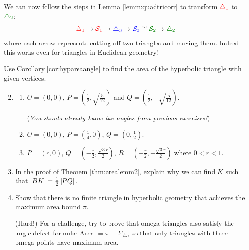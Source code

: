 We can now follow the steps in Lemma \ref{lemm:quadtricorr} to transform $\textcolor{red}{\triangle_1}$ to $\textcolor{Green}{\triangle_2}$:
\[
	\textcolor{red}{\triangle_1}\to \textcolor{red}{\cS_1}\to \textcolor{blue}{\triangle_3}\to \textcolor{blue}{\cS_3}\cong \textcolor{Green}{\cS_2}\to \textcolor{Green}{\triangle_2}
\]
where each arrow represents cutting off two triangles and moving them. Indeed this works even for triangles in Euclidean geometry!

\goodbreak


\begin{exercises}
	\exstart Use Corollary \ref{cor:hypareaangle} to find the area of the hyperbolic triangle with given vertices.
	\begin{enumerate}\setcounter{enumi}{1}
	  \item[]\begin{enumerate}
	    \item $O=(0,0)$, $P=(\frac 12,\sqrt{\frac 5{12}})$ and $Q=(\frac 12,-\sqrt{\frac 5{12}})$.\par
			(\emph{You should already know the angles from previous exercises!})
	    \item $O=(0,0)$, $P=(\frac 14,0)$, $Q=(0,\frac 12)$.
	    \item $P=(r,0)$, $Q=\left(-\frac r2,\frac{\sqrt{3}r}2\right)$, $R=\left(-\frac r2,-\frac{\sqrt{3}r}2\right)$ where $0<r<1$.
		\end{enumerate}
		
		\item In the proof of Theorem \ref{thm:arealemm2}, explain why we can find $K$ such that $\left| BK\right|=\frac 12\left| PQ\right|$. 
		
		

   
	   \item Show that there is no finite triangle in hyperbolic geometry that achieves the maximum area bound $\pi$.\par
	  (Hard!) For a challenge, try to prove that omega-triangles also satisfy the angle-defect formula: Area $=\pi-\Sigma_\triangle$, so that only triangles with three omega-points have maximum area.
	

\end{enumerate}
\end{exercises}
